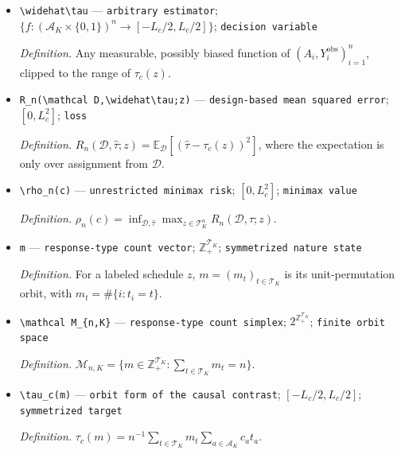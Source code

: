 \documentclass{article}
\begin{document}
\begin{itemize}
  \par\smallskip\noindent\emph{Definition.} \(\tau_c(z)=n^{-1}\sum_{i=1}^n\sum_{a\in\mathcal A_K}c_at_{i,a}\).
  \item \texttt{\textbackslash{}\allowbreak{}widehat\textbackslash{}\allowbreak{}tau} --- \texttt{arbitrary estimator}; \(\{f:(\mathcal A_K\times\{0,1\})^n\to[-L_c/2,L_c/2]\}\); \texttt{decision variable}
  \par\smallskip\noindent\emph{Definition.} Any measurable, possibly biased function of \((A_i,Y_i^{\mathrm{obs}})_{i=1}^n\), clipped to the range of \(\tau_c(z)\).
  \item \texttt{R\_\allowbreak{}n(\textbackslash{}\allowbreak{}mathcal D,\allowbreak{}\textbackslash{}\allowbreak{}widehat\textbackslash{}\allowbreak{}tau;\allowbreak{}z)} --- \texttt{design-\allowbreak{}based mean squared error}; \([0,L_c^2]\); \texttt{loss}
  \par\smallskip\noindent\emph{Definition.} \(R_n(\mathcal D,\widehat\tau;z)=\mathbb E_{\mathcal D}[(\widehat\tau-\tau_c(z))^2]\), where the expectation is only over assignment from \(\mathcal D\).
  \item \texttt{\textbackslash{}\allowbreak{}rho\_\allowbreak{}n(c)} --- \texttt{unrestricted minimax risk}; \([0,L_c^2]\); \texttt{minimax value}
  \par\smallskip\noindent\emph{Definition.} \(\rho_n(c)=\inf_{\mathcal D,\widehat\tau}\max_{z\in\mathcal T_K^n}R_n(\mathcal D,\widehat\tau;z)\).
  \item \texttt{m} --- \texttt{response-\allowbreak{}type count vector}; \(\mathbb Z_+^{\mathcal T_K}\); \texttt{symmetrized nature state}
  \par\smallskip\noindent\emph{Definition.} For a labeled schedule \(z\), \(m=(m_t)_{t\in\mathcal T_K}\) is its unit-permutation orbit, with \(m_t=\#\{i:t_i=t\}\).
  \item \texttt{\textbackslash{}\allowbreak{}mathcal M\_\allowbreak{}\{n,\allowbreak{}K\}\allowbreak{}} --- \texttt{response-\allowbreak{}type count simplex}; \(2^{\mathbb Z_+^{\mathcal T_K}}\); \texttt{finite orbit space}
  \par\smallskip\noindent\emph{Definition.} \(\mathcal M_{n,K}=\{m\in\mathbb Z_+^{\mathcal T_K}:\sum_{t\in\mathcal T_K}m_t=n\}\).
  \item \texttt{\textbackslash{}\allowbreak{}tau\_\allowbreak{}c(m)} --- \texttt{orbit form of the causal contrast}; \([-L_c/2,L_c/2]\); \texttt{symmetrized target}
  \par\smallskip\noindent\emph{Definition.} \(\tau_c(m)=n^{-1}\sum_{t\in\mathcal T_K}m_t\sum_{a\in\mathcal A_K}c_at_a\).

\end{itemize}
\end{document}
